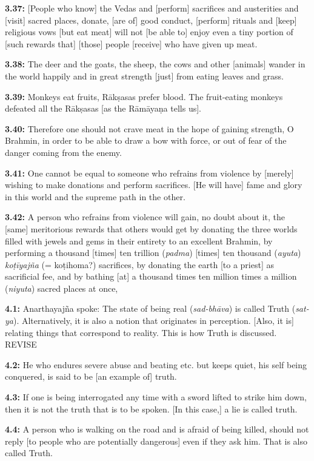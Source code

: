 \documentclass{article}
\newcommand{\vsnum}[1]{\textbf{#1}}
\newcommand{\skt}[1]{\textit{#1}}
\begin{document}
\vsnum{3.37: }[People who know] the Vedas and [perform] sacrifices and austerities and [visit] sacred places, donate, [are of] good conduct, [perform] rituals and [keep] religious vows [but eat meat] will not [be able to] enjoy even a tiny portion of [such rewards that] [those] people [receive] who have given up meat.

\vsnum{3.38: }The deer and the goats, the sheep, the cows and other [animals] wander in the world happily and in great strength [just] from eating leaves and grass.

\vsnum{3.39: }Monkeys eat fruits, Rākṣasas prefer blood. The fruit-eating monkeys defeated all the Rākṣasas [as the Rāmāyaṇa tells us].

\vsnum{3.40: }Therefore one should not crave meat in the hope of gaining strength, O Brahmin,  in order to be able to draw a bow with force, or out of fear of the danger coming from the enemy.

\vsnum{3.41: }One cannot be equal to someone who refrains from violence by [merely] wishing to make donations and perform sacrifices. [He will have] fame and glory in this world and the supreme path in the other.

\vsnum{3.42: }A person who refrains from violence will gain, no doubt about it, the [same] meritorious rewards that others would get by donating the three worlds filled with jewels and gems in their entirety to an excellent Brahmin, by performing a thousand [times] ten trillion (\skt{padma}) [times] ten thousand (\skt{ayuta}) \skt{koṭīyajña} (= koṭihoma?) sacrifices, by donating the earth [to a priest] as sacrificial fee, and by bathing [at] a thousand times ten million times a million (\skt{niyuta}) sacred places at once,


\vsnum{4.1: }Anarthayajña spoke: The state of being real (\skt{sad-bhāva}) is called Truth (\skt{sat-ya}). Alternatively, it is also a notion that originates in perception. [Also, it is] relating things that correspond to reality. This is how Truth is discussed. REVISE

\vsnum{4.2: }He who endures severe abuse and beating etc. but keeps quiet, his self being conquered, is said to be [an example of] truth.

\vsnum{4.3: }If one is being interrogated any time with a sword lifted to strike him down, then it is not the truth that is to be spoken. [In this case,] a lie is called truth.

\vsnum{4.4: }A person who is walking on the road and is afraid of being killed, should not reply [to people who are potentially dangerous] even if they ask him. That is also called Truth.
\end{document}
